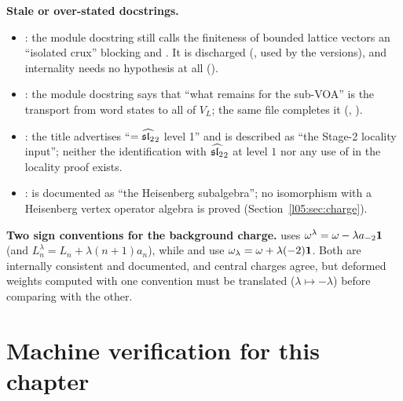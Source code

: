 \begin{warning}
\textbf{Stale or over-stated docstrings.}
\begin{itemize}
\item {}: the module docstring still calls the finiteness of bounded lattice
  vectors an ``isolated crux'' blocking  and . It is
  discharged (, used by the  versions), and internality needs no
  hypothesis at all ().
\item {}: the module docstring says that ``what remains for the sub-VOA'' is the
  transport from word states to all of $V_L$; the same file completes it (,
  ).
\item {}: the title advertises ``$=\widehat{\mathfrak{sl}_2}_2$ level 1'' and
   is described as ``the Stage-2 locality input''; neither the identification with
  $\widehat{\mathfrak{sl}_2}_2$ at level $1$ nor any use of  in the locality proof exists.
\item {}:  is documented as ``the Heisenberg subalgebra'';
  no isomorphism with a Heisenberg vertex operator algebra is proved (Section~\ref{l05:sec:charge}).
\end{itemize}
\end{warning}

\begin{warning}
\textbf{Two sign conventions for the background charge.}  uses
$\omega^\lambda=\omega-\lambda a_{-2}\mathbf{1}$ (and  $L^\lambda_n=L_n+\lambda(n+1)a_n$), while
 and  use $\omega_\lambda=\omega+\lambda(-2)\mathbf{1}$.
Both are internally consistent and documented, and central charges agree, but deformed weights computed with one
convention must be translated ($\lambda\mapsto-\lambda$) before comparing with the other.
\end{warning}

\section{Machine verification for this chapter}\label{l05:sec:audit}

